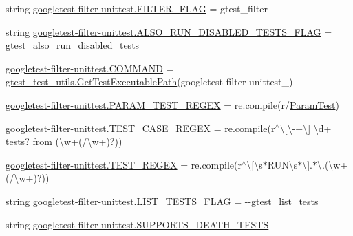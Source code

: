\begin{DoxyCompactItemize}
string \mbox{\hyperlink{namespacegoogletest-filter-unittest_ac1f80cdfddece685ad526019b12fe2e3}{googletest-\/filter-\/unittest.\+F\+I\+L\+T\+E\+R\+\_\+\+F\+L\+AG}} = \textquotesingle{}gtest\+\_\+filter\textquotesingle{}
\item 
string \mbox{\hyperlink{namespacegoogletest-filter-unittest_abf498ba8de8ed89f11e552d89108a79f}{googletest-\/filter-\/unittest.\+A\+L\+S\+O\+\_\+\+R\+U\+N\+\_\+\+D\+I\+S\+A\+B\+L\+E\+D\+\_\+\+T\+E\+S\+T\+S\+\_\+\+F\+L\+AG}} = \textquotesingle{}gtest\+\_\+also\+\_\+run\+\_\+disabled\+\_\+tests\textquotesingle{}
\item 
\mbox{\hyperlink{namespacegoogletest-filter-unittest_a0d1ea907e2ca14e1335cbf270df41bac}{googletest-\/filter-\/unittest.\+C\+O\+M\+M\+A\+ND}} = \mbox{\hyperlink{namespacegtest__test__utils_a89ed3717984a80ffbb7a9c92f71b86a2}{gtest\+\_\+test\+\_\+utils.\+Get\+Test\+Executable\+Path}}(\textquotesingle{}googletest-\/filter-\/unittest\+\_\+\textquotesingle{})
\item 
\mbox{\hyperlink{namespacegoogletest-filter-unittest_af77bfd6536a2e3193efc40a697c0d973}{googletest-\/filter-\/unittest.\+P\+A\+R\+A\+M\+\_\+\+T\+E\+S\+T\+\_\+\+R\+E\+G\+EX}} = re.\+compile(r\textquotesingle{}/\mbox{\hyperlink{classParamTest}{Param\+Test}}\textquotesingle{})
\item 
\mbox{\hyperlink{namespacegoogletest-filter-unittest_a7a56afb8dd8204a811746ffe2ae508cb}{googletest-\/filter-\/unittest.\+T\+E\+S\+T\+\_\+\+C\+A\+S\+E\+\_\+\+R\+E\+G\+EX}} = re.\+compile(r\textquotesingle{}$^\wedge$\textbackslash{}\mbox{[}\textbackslash{}-\/+\textbackslash{}\mbox{]} \textbackslash{}d+ tests? from (\textbackslash{}w+(/\textbackslash{}w+)?)\textquotesingle{})
\item 
\mbox{\hyperlink{namespacegoogletest-filter-unittest_aa92cd55f293bfe9c69a9cfcd12f2486d}{googletest-\/filter-\/unittest.\+T\+E\+S\+T\+\_\+\+R\+E\+G\+EX}} = re.\+compile(r\textquotesingle{}$^\wedge$\textbackslash{}\mbox{[}\textbackslash{}s$\ast$R\+U\+N\textbackslash{}s$\ast$\textbackslash{}\mbox{]}.$\ast$\textbackslash{}.(\textbackslash{}w+(/\textbackslash{}w+)?)\textquotesingle{})
\item 
string \mbox{\hyperlink{namespacegoogletest-filter-unittest_a74c619e65e9f5ff467438c37936138d1}{googletest-\/filter-\/unittest.\+L\+I\+S\+T\+\_\+\+T\+E\+S\+T\+S\+\_\+\+F\+L\+AG}} = \textquotesingle{}-\/-\/gtest\+\_\+list\+\_\+tests\textquotesingle{}
\item 
string \mbox{\hyperlink{namespacegoogletest-filter-unittest_a5aaa3e6381c05a68e780b8050e524644}{googletest-\/filter-\/unittest.\+S\+U\+P\+P\+O\+R\+T\+S\+\_\+\+D\+E\+A\+T\+H\+\_\+\+T\+E\+S\+TS}}

\end{DoxyCompactItemize}
